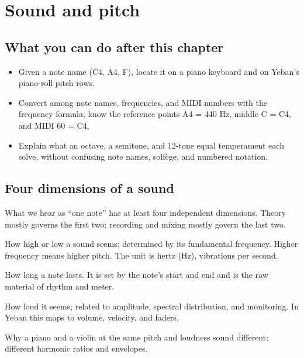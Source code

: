 \chapter{Sound and pitch}


\label{sec:sound-and-pitch}

\section*{What you can do after this chapter}
\begin{itemize}
  \item Given a note name (C4, A4, F), locate it on a piano keyboard and on Yeban's piano-roll pitch rows.
  \item Convert among note names, frequencies, and MIDI numbers with the frequency formula; know the reference points A4 = 440 Hz, middle C = C4, and MIDI 60 = C4.
  \item Explain what an octave, a semitone, and 12-tone equal temperament each solve, without confusing note names, solfège, and numbered notation.
\end{itemize}

\section{Four dimensions of a sound}

What we hear as ``one note'' has at least four independent dimensions. Theory mostly governs the first two; recording and mixing mostly govern the last two.

\begin{description}[leftmargin=2.2em,style=nextline]
  \item[Pitch] How high or low a sound seems; determined by its fundamental frequency. Higher frequency means higher pitch. The unit is hertz (Hz), vibrations per second.
  \item[Duration] How long a note lasts. It is set by the note's start and end and is the raw material of rhythm and meter.
  \item[Loudness] How loud it seems; related to amplitude, spectral distribution, and monitoring. In Yeban this maps to volume, velocity, and faders.
  \item[Timbre] Why a piano and a violin at the same pitch and loudness sound different: different harmonic ratios and envelopes.
\end{description}


